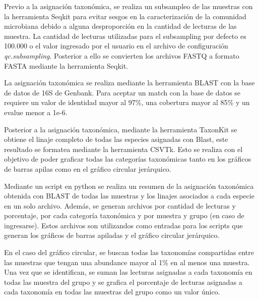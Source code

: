 Previo a la asignación taxonómica, se realiza un subsampleo de las muestras con la herramienta Seqkit para evitar sesgos en la caracterización de la comunidad microbiana debido a alguna desproporción en la cantidad de lecturas de las muestra.
La cantidad de lecturas utilizadas para el subsampling por defecto es 100.000 o el valor ingresado por el usuario en el archivo de configuración \textit{qc.subsampling}.
Posterior a ello se convierten los archivos FASTQ a formato FASTA mediante la herramienta Seqkit.

La asignación taxonómica se realiza mediante la herramienta BLAST con la base de datos de 16S de Genbank. 
Para aceptar un match con la base de datos se requiere un valor de identidad mayor al 97\%, una cobertura mayor al 85\% y un evalue menor a 1e-6.

Posterior a la asignación taxonómica, mediante la herramienta TaxonKit se obtiene el linaje completo de todas las especies asignadas con Blast, este resultado se formatea mediante la herramienta CSVTk. 
Esto se realiza con el objetivo de poder graficar todas las categorías taxonómicas tanto en los gráficos de barras apilas como en el gráfico circular jerárquico.

Mediante un script en python se realiza un resumen de la asignación taxonómica obtenida con BLAST de todas las muestras y los linajes asociados a cada especie en un solo archivo. Además, se generan archivos por cantidad de lecturas y porcentaje, por cada categoría taxonómica y por muestra y grupo (en caso de ingresarse).
Estos archivos son utilizandos como entradas para los scripts que generan los gráficos de barras apiladas y  el gráfico circular jerárquico.


En el caso del gráfico circular, se buscan todas las taxonomías compartidas entre las muestras que tengan una abundance mayor al 1\% en al menos una muestra. 
Una vez que se identifican, se suman las lecturas asignadas a cada taxonomía en todas las muestra del grupo y se grafica el porcentaje de lecturas asignadas a cada taxonomía en todas las muestras del grupo como un valor único.

